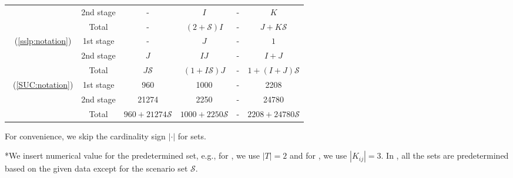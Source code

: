 \begin{table}[H]
{\begin{threeparttable}
\begin{tabular}{@{}cccccc@{}}
				& 2nd stage & -              & $I$                                & -                    & $K$                       \\ \cmidrule(l){2-6} 
				& Total          & -              & $(2+\mathcal{S})I$                 & -                    & $J+K\mathcal{S}$          \\ \midrule
				\multirow{3}{*}{\sslp\ (\ref{sslp:notation})}   & 1st stage & -              & $J$                                & -                    & $1$                       \\
				& 2nd stage & $J$            & $IJ$                               & -                    & $I+J$                     \\ \cmidrule(l){2-6} 
				& Total          & $J\mathcal{S}$ & $(1+I\mathcal{S})J$                & -                    & $1+(I+J)\mathcal{S}$      \\ \midrule
				\multirow{3}{*}{\suc\ (\ref{SUC:notation})}   & 1st stage & 960               &   1000                                 &     -                 &  2208                         \\
				& 2nd stage & 21274               &     2250                               &   -                   & 24780                          \\ \cmidrule(l){2-6} 
				& Total          & $960+21274\mathcal{S}$                &  $1000+2250\mathcal{S}$                                  &  -                    &  $2208+24780\mathcal{S}$                         \\ \bottomrule
			\end{tabular}
			
			\begin{tablenotes}
				\small
				\item *For convenience, we skip the cardinality sign $|\cdot|$ for sets.
				\item **We insert numerical value for the predetermined set, e.g., for \sizes, we use $|T|=2$ and for \mptsps, we use $|K_{ij}|=3$. In \suc, all the sets are predetermined based on the given data except for the scenario set $\mathcal{S}$.
			\end{tablenotes}
		\end{threeparttable}
	}
\end{table}


